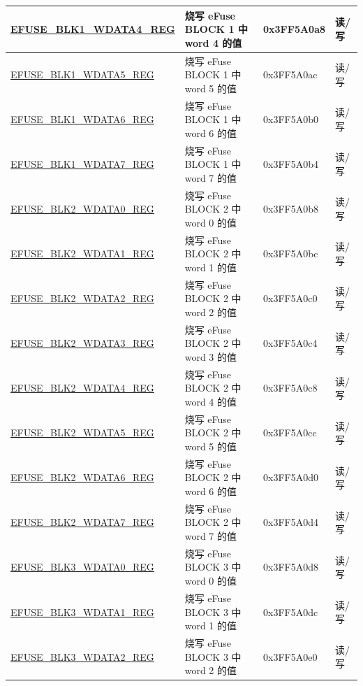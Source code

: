 \begin{longtable}{ | p{5cm} | p{7.5cm} | p{2cm} | p{1cm} | }
    \hyperref[regdesc:EFUSEBLK1WDATAnREG]{EFUSE\_BLK1\_WDATA4\_REG} & 烧写 eFuse BLOCK 1 中 word 4 的值 & 0x3FF5A0a8 & 读/写 \\ \hline
    \hyperref[regdesc:EFUSEBLK1WDATAnREG]{EFUSE\_BLK1\_WDATA5\_REG} & 烧写 eFuse BLOCK 1 中 word 5 的值 & 0x3FF5A0ac & 读/写 \\ \hline
    \hyperref[regdesc:EFUSEBLK1WDATAnREG]{EFUSE\_BLK1\_WDATA6\_REG} & 烧写 eFuse BLOCK 1 中 word 6 的值 & 0x3FF5A0b0 & 读/写 \\ \hline
    \hyperref[regdesc:EFUSEBLK1WDATAnREG]{EFUSE\_BLK1\_WDATA7\_REG} & 烧写 eFuse BLOCK 1 中 word 7 的值 & 0x3FF5A0b4 & 读/写 \\ \hline
    \hyperref[regdesc:EFUSEBLK2WDATAnREG]{EFUSE\_BLK2\_WDATA0\_REG} & 烧写 eFuse BLOCK 2 中 word 0 的值 & 0x3FF5A0b8 & 读/写 \\ \hline
    \hyperref[regdesc:EFUSEBLK2WDATAnREG]{EFUSE\_BLK2\_WDATA1\_REG} & 烧写 eFuse BLOCK 2 中 word 1 的值 & 0x3FF5A0bc & 读/写 \\ \hline
    \hyperref[regdesc:EFUSEBLK2WDATAnREG]{EFUSE\_BLK2\_WDATA2\_REG} & 烧写 eFuse BLOCK 2 中 word 2 的值 & 0x3FF5A0c0 & 读/写 \\ \hline
    \hyperref[regdesc:EFUSEBLK2WDATAnREG]{EFUSE\_BLK2\_WDATA3\_REG} & 烧写 eFuse BLOCK 2 中 word 3 的值 & 0x3FF5A0c4 & 读/写 \\ \hline
    \hyperref[regdesc:EFUSEBLK2WDATAnREG]{EFUSE\_BLK2\_WDATA4\_REG} & 烧写 eFuse BLOCK 2 中 word 4 的值 & 0x3FF5A0c8 & 读/写 \\ \hline
    \hyperref[regdesc:EFUSEBLK2WDATAnREG]{EFUSE\_BLK2\_WDATA5\_REG} &烧写 eFuse BLOCK 2 中 word 5 的值& 0x3FF5A0cc & 读/写 \\ \hline
    \hyperref[regdesc:EFUSEBLK2WDATAnREG]{EFUSE\_BLK2\_WDATA6\_REG} & 烧写 eFuse BLOCK 2 中 word 6 的值 & 0x3FF5A0d0 & 读/写 \\ \hline
    \hyperref[regdesc:EFUSEBLK2WDATAnREG]{EFUSE\_BLK2\_WDATA7\_REG} & 烧写 eFuse BLOCK 2 中 word 7 的值 & 0x3FF5A0d4 & 读/写 \\ \hline
    \hyperref[regdesc:EFUSEBLK3WDATAnREG]{EFUSE\_BLK3\_WDATA0\_REG} &烧写 eFuse BLOCK 3 中 word 0 的值 & 0x3FF5A0d8 & 读/写 \\ \hline
    \hyperref[regdesc:EFUSEBLK3WDATAnREG]{EFUSE\_BLK3\_WDATA1\_REG} & 烧写 eFuse BLOCK 3 中 word 1 的值 & 0x3FF5A0dc & 读/写 \\ \hline
    \hyperref[regdesc:EFUSEBLK3WDATAnREG]{EFUSE\_BLK3\_WDATA2\_REG} & 烧写 eFuse BLOCK 3 中 word 2 的值 & 0x3FF5A0e0 & 读/写 \\ \hline

\end{longtable}
